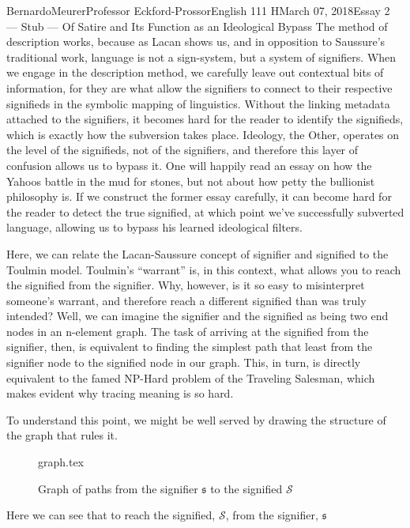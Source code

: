 \documentclass[12pt,letterpaper]{article}
\begin{document}
\begin{mla}{Bernardo}{Meurer}{Professor Eckford-Prossor}{English 111 H}{March 07, 2018}{Essay 2 --- Stub --- Of Satire and Its Function as an Ideological Bypass}
    The method of description works, because as Lacan shows us, and in opposition to Saussure's traditional work, language is not a sign-system, but a system of signifiers. When  we engage in the description method, we carefully leave out contextual bits of information, for they are what allow the signifiers to connect to their respective signifieds in the symbolic mapping of linguistics. Without the linking metadata attached to the signifiers, it becomes hard for the reader to identify the signifieds, which is exactly how the subversion takes place. Ideology, the Other, operates on the level of the signifieds, not of the signifiers, and therefore this layer of confusion allows us to bypass it. One will happily read an essay on how the Yahoos battle in the mud for stones, but not about how petty the bullionist philosophy is. If we construct the former essay carefully, it can become hard for the reader to detect the true signified, at which point we've successfully subverted language, allowing us to bypass his learned ideological filters.

     Here, we can relate the Lacan-Saussure concept of signifier and signified to the Toulmin model. Toulmin's ``warrant'' is, in this context, what allows you to reach the signified from the signifier. Why, however, is it so easy to misinterpret someone's warrant, and therefore reach a different signified than was truly intended? Well, we can imagine the signifier and the signified as being two end nodes in an n-element graph. The task of arriving at the signified from the signifier, then, is equivalent to finding the simplest path that least from the signifier node to the signified node in our graph. This, in turn, is directly equivalent to the famed NP-Hard problem of the Traveling Salesman, which makes evident why tracing meaning is so hard.

    To understand this point, we might be well served by drawing the structure of the graph that rules it.
    \begin{figure}[H]
        \centering
        {graph.tex}
        \caption{Graph of paths from the signifier \(\mathfrak{s}\) to the signified \(\mathscr{S}\)}\label{fig:graph}
    \end{figure}
    Here we can see that to reach the signified, \(\mathscr{S}\), 
    from the signifier, \(\mathfrak{s}\)


\end{mla}
\end{document}

